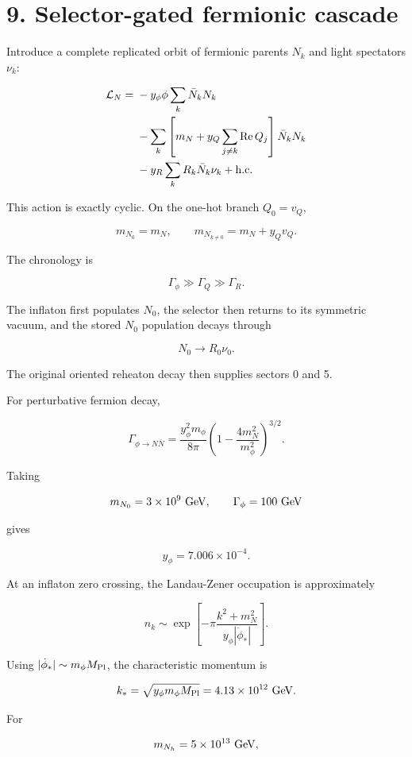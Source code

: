 \documentclass[
  10pt,
]{article}
\begin{document}
\section{9. Selector-gated fermionic
cascade}\label{selector-gated-fermionic-cascade}

Introduce a complete replicated orbit of fermionic parents \(N_k\) and
light spectators \(\nu_k\):

\[
\begin{aligned}
\mathcal L_N
={}&
-y_\phi\phi\sum_k\bar N_kN_k
\\
&-\sum_k
\left[
m_N+y_Q\sum_{j\ne k}{\rm Re}\,Q_j
\right]\bar N_kN_k
\\
&-y_R\sum_kR_k\bar N_k\nu_k+{\rm h.c.}
\end{aligned}
\]

This action is exactly cyclic. On the one-hot branch \(Q_0=v_Q\),

\[
m_{N_0}=m_N,
\qquad
m_{N_{k\ne0}}=m_N+y_Qv_Q.
\]

The chronology is

\[
\boxed{
\Gamma_\phi\gg\Gamma_Q\gg\Gamma_R.}
\]

The inflaton first populates \(N_0\), the selector then returns to its
symmetric vacuum, and the stored \(N_0\) population decays through

\[
N_0\to R_0\nu_0.
\]

The original oriented reheaton decay then supplies sectors 0 and 5.

For perturbative fermion decay,

\[
\Gamma_{\phi\to N\bar N}
=
\frac{y_\phi^2m_\phi}{8\pi}
\left(1-\frac{4m_N^2}{m_\phi^2}\right)^{3/2}.
\]

Taking

\[
m_{N_0}=3\times10^9\ {\rm GeV},
\qquad
\Gamma_\phi=100\ {\rm GeV}
\]

gives

\[
y_\phi=7.006\times10^{-4}.
\]

At an inflaton zero crossing, the Landau-Zener occupation is
approximately

\[
n_k
\sim
\exp\left[
-\pi\frac{k^2+m_N^2}{y_\phi|\dot\phi_*|}
\right].
\]

Using \(|\dot\phi_*|\sim m_\phi M_{\rm Pl}\), the characteristic
momentum is

\[
k_*=\sqrt{y_\phi m_\phi M_{\rm Pl}}
=4.13\times10^{12}\ {\rm GeV}.
\]

For

\[
m_{N_h}=5\times10^{13}\ {\rm GeV},
\]
\end{document}
